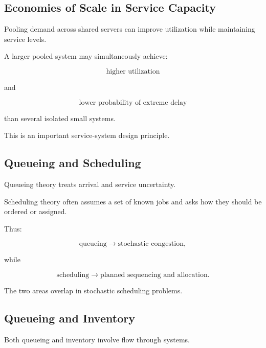 \subsection{Economies of Scale in Service Capacity}
\label{subsec:service-economies-scale}

Pooling demand across shared servers can improve utilization while
maintaining service levels.

A larger pooled system may simultaneously achieve:

\[
\boxed{
\text{higher utilization}
}
\]

and

\[
\boxed{
\text{lower probability of extreme delay}
}
\]

than several isolated small systems.

This is an important service-system design principle.

\subsection{Queueing and Scheduling}
\label{subsec:queueing-scheduling-connection}

Queueing theory treats arrival and service uncertainty.

Scheduling theory often assumes a set of known jobs and asks how they
should be ordered or assigned.

Thus:

\[
\boxed{
\text{queueing}
\rightarrow
\text{stochastic congestion},
}
\]

while

\[
\boxed{
\text{scheduling}
\rightarrow
\text{planned sequencing and allocation}.
}
\]

The two areas overlap in stochastic scheduling problems.

\subsection{Queueing and Inventory}
\label{subsec:queueing-inventory-connection}

Both queueing and inventory involve flow through systems.

